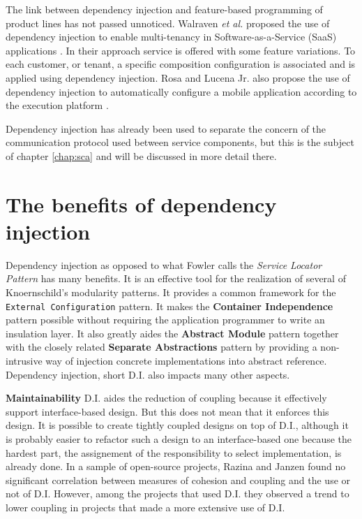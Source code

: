 The link between dependency injection and feature-based programming of product lines has not passed unnoticed.
Walraven \emph{et al.} proposed the use of dependency injection to enable multi-tenancy in Software-as-a-Service
(SaaS) applications \cite{Walraven} \cite{Truyen}. In their approach service is offered with some feature variations.
To each customer, or tenant, a specific composition configuration is associated and is applied using dependency
injection. Rosa and Lucena Jr. also propose the use of dependency injection to automatically configure a mobile
application according to the execution platform \cite{Rosa}.

Dependency injection has already been used to separate the concern of the communication protocol used between
service components, but this is the subject of chapter \ref{chap:sca} and will be discussed in more detail there.

\section{The benefits of dependency injection}

Dependency injection as opposed to what Fowler calls the \emph{Service Locator Pattern} has many benefits.
It is an effective tool for the realization of several of Knoernschild's modularity patterns. It provides
a common framework for the \texttt{External Configuration} pattern. It makes the \textbf{Container Independence}
pattern possible without requiring the application programmer to write an insulation layer. It also greatly
aides the \textbf{Abstract Module} pattern together with the closely related \textbf{Separate Abstractions} pattern
by providing a non-intrusive way of injection concrete implementations into abstract reference.
Dependency injection, short D.I. also impacts many other aspects.

\textbf{Maintainability} D.I. aides the reduction of coupling because it effectively support interface-based
design. But this does not mean that it enforces this design. It is possible to create tightly coupled
designs on top of D.I., although it is probably easier to refactor such a design to an interface-based
one because the hardest part, the assignement of the responsibility to select implementation, is already
done. In a sample of open-source projects, Razina and Janzen found no significant correlation between
measures of cohesion and coupling and the use or not of D.I. However, among the projects that used D.I.
they observed a trend to lower coupling in projects that made a more extensive use of D.I. \cite{Razina}

